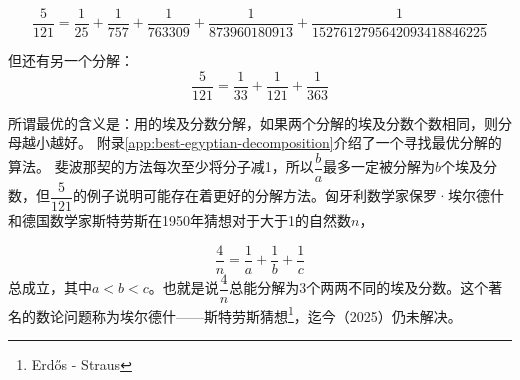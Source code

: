 \documentclass[b5paper]{ctexart}
\begin{document}
\[
\frac{5}{121} = \frac{1}{25} + \frac{1}{757} + \frac{1}{763309} + \frac{1}{873960180913} + \frac{1}{1527612795642093418846225}
\]

但还有另一个分解：
\[
\frac{5}{121} = \frac{1}{33} + \frac{1}{121} + \frac{1}{363}
\]

所谓最优的含义是：用的埃及分数分解，如果两个分解的埃及分数个数相同，则分母越小越好。
附录\ref{app:best-egyptian-decomposition}介绍了一个寻找最优分解的算法。
斐波那契的方法每次至少将分子减1，所以$\dfrac{b}{a}$最多一定被分解为$b$个埃及分数，但$\dfrac{5}{121}$的例子说明可能存在着更好的分解方法。匈牙利数学家保罗·埃尔德什和德国数学家斯特劳斯在1950年猜想对于大于1的自然数$n$，

\[
\frac{4}{n} = \frac{1}{a} + \frac{1}{b} + \frac{1}{c}
\]
总成立，其中$a < b < c$。也就是说$\dfrac{4}{n}$总能分解为3个两两不同的埃及分数。这个著名的数论问题称为埃尔德什——斯特劳斯猜想\footnote{Erdős - Straus}，迄今（2025）仍未解决。
\end{document}

